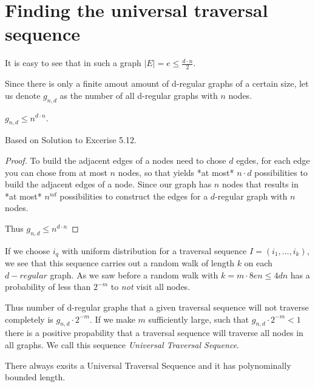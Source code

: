 \section{Finding the universal traversal
sequence}\label{finding-the-universal-traversal-sequence}

It is easy to see that in such a graph
$|E| = e \leq \frac{d \cdot n}{2}$.

Since there is only a finite amout amount of d-regular graphs of a
certain size, let us denote $g_{n,d}$ as the number of all d-regular
graphs with $n$ nodes.

\vspace{0.5cm}

\begin{thm}
$g_{n,d} \leq n^{d \cdot n}$.
\end{thm}

Based on  Solution to Excerise
5.12.

\begin{proof}
To build the adjacent edges of a nodes need to chose $d$ egdes, for each edge you can chose from at most $n$ nodes,
so that yields *at most* $n \cdot d$ possibilities to build the adjacent edges of a node.
Since our graph has $n$ nodes that results in *at most* $n^{nd}$ possibilities to construct the edges for a $d$-regular graph with $n$ nodes.

Thus $g_{n,d} \leq n^{d \cdot n}$
\end{proof}

If we choose $i_q$ with uniform distribution for a traversal sequence
$I = (i_1, ..., i_k)$, we see that this sequence carries out a random
walk of length $k$ on each $d-regular$ graph. As we saw before a random
walk with $k = m \cdot 8en \leq 4dn$ has a probability of less than
$2^{-m}$ to \emph{not} visit all nodes.

Thus number of d-regular graphs that a given traversal sequence will not
traverse completely is $g_{n, d} \cdot 2^{-m}$. If we make $m$
sufficiently large, such that $g_{n, d} \cdot 2^{-m} < 1$ there is a
positive propability that a traversal sequence will traverse all nodes
in all graphs. We call this sequence \emph{Universal Traversal
Sequence}.

\vspace{0.5cm}

\begin{thm}
There always exsits a Universal Traversal Sequence and it has polynominally bounded length.
\end{thm}

